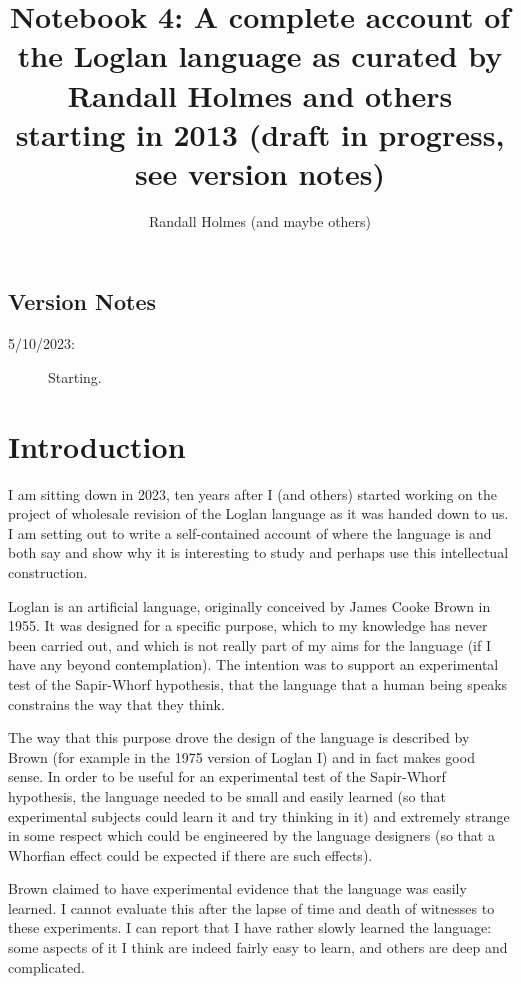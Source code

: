\documentclass[12pt]{article}
\title{Notebook 4:  A complete account of the Loglan language as curated by Randall Holmes and others starting in 2013 (draft in progress, see version notes)
}
\author{Randall Holmes (and maybe others)}
\begin{document}
\maketitle

\tableofcontents

\newpage

\subsection{Version Notes}

\begin{description}

\item[5/10/2023:]  Starting.

\end{description}

\newpage

\section{Introduction}

I am sitting down in 2023, ten years after I (and others) started working on the project of wholesale revision of the Loglan language as it was handed down to us.  I am setting out to write a self-contained account of where the language is and both say and show why it is interesting to study and perhaps use this intellectual construction.

Loglan is an artificial language, originally conceived by James Cooke Brown in 1955.  It was designed for a specific purpose, which to my knowledge has never been carried out, and which is not really part of my aims for the language (if I have any beyond contemplation).  The intention was to support an experimental test of the Sapir-Whorf hypothesis, that the language that a human being speaks constrains the way that they think.

The way that this purpose drove the design of the language is described by Brown (for example in the 1975 version of Loglan I) and in fact makes good sense.  In order to be useful for an experimental test of the Sapir-Whorf hypothesis, the language needed to be small and easily learned (so that experimental subjects could learn it and try thinking in it) and extremely strange in some respect which could be engineered by the language designers (so that a Whorfian effect could be expected if there are such effects).

Brown claimed to have experimental evidence that the language was easily learned.  I cannot evaluate this after the lapse of time and death of witnesses to these experiments.  I can report that I have rather slowly learned the language:  some aspects of it I think are indeed fairly easy to learn, and others are deep and complicated.
\end{document}
